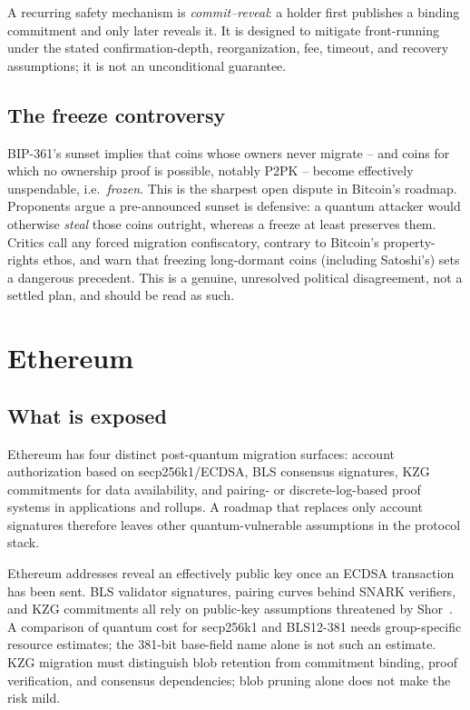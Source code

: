 A recurring safety mechanism is \emph{commit--reveal}: a holder first publishes a
binding commitment and only later reveals it. It is designed to mitigate front-running
under the stated confirmation-depth, reorganization, fee, timeout, and recovery
assumptions; it is not an unconditional guarantee.

\subsection{The freeze controversy}
\label{sec:freeze}
BIP-361's sunset implies that coins whose owners never migrate -- and coins for which no ownership proof is possible, notably P2PK -- become effectively unspendable, i.e.\ \emph{frozen}. This is the sharpest open dispute in Bitcoin's roadmap. Proponents argue a pre-announced sunset is defensive: a quantum attacker would otherwise \emph{steal} those coins outright, whereas a freeze at least preserves them. Critics call any forced migration confiscatory, contrary to Bitcoin's property-rights ethos, and warn that freezing long-dormant coins (including Satoshi's) sets a dangerous precedent. This is a genuine, unresolved political disagreement, not a settled plan, and should be read as such.

\section{Ethereum}
\subsection{What is exposed}
Ethereum has four distinct post-quantum migration surfaces: account authorization
based on secp256k1/ECDSA, BLS consensus signatures, KZG commitments for data
availability, and pairing- or discrete-log-based proof systems in applications and
rollups. A roadmap that replaces only account signatures therefore leaves other
quantum-vulnerable assumptions in the protocol stack.

Ethereum addresses reveal an effectively public key once an ECDSA transaction has been
sent. BLS validator signatures, pairing curves behind SNARK verifiers, and KZG
commitments all rely on public-key assumptions threatened by Shor~\cite{ethpqroadmap,quantumhorizon2026}.
A comparison of quantum cost for secp256k1 and BLS12-381 needs group-specific resource
estimates; the 381-bit base-field name alone is not such an estimate. KZG migration
must distinguish blob retention from commitment binding, proof verification, and
consensus dependencies; blob pruning alone does not make the risk mild.


